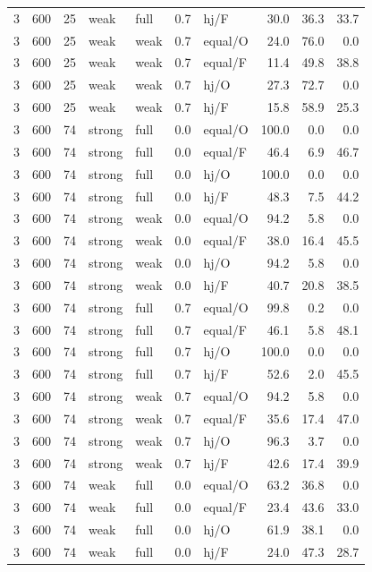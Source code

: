 {\begin{longtable}{@{}rrrllllrrr@{}}
3 & 600 & 25 & weak & full & 0.7 & hj/F & 30.0 & 36.3 & 33.7\\
3 & 600 & 25 & weak & weak & 0.7 & equal/O & 24.0 & 76.0 & 0.0\\
3 & 600 & 25 & weak & weak & 0.7 & equal/F & 11.4 & 49.8 & 38.8\\
3 & 600 & 25 & weak & weak & 0.7 & hj/O & 27.3 & 72.7 & 0.0\\
3 & 600 & 25 & weak & weak & 0.7 & hj/F & 15.8 & 58.9 & 25.3\\
3 & 600 & 74 & strong & full & 0.0 & equal/O & 100.0 & 0.0 & 0.0\\
3 & 600 & 74 & strong & full & 0.0 & equal/F & 46.4 & 6.9 & 46.7\\
3 & 600 & 74 & strong & full & 0.0 & hj/O & 100.0 & 0.0 & 0.0\\
3 & 600 & 74 & strong & full & 0.0 & hj/F & 48.3 & 7.5 & 44.2\\
3 & 600 & 74 & strong & weak & 0.0 & equal/O & 94.2 & 5.8 & 0.0\\
3 & 600 & 74 & strong & weak & 0.0 & equal/F & 38.0 & 16.4 & 45.5\\
3 & 600 & 74 & strong & weak & 0.0 & hj/O & 94.2 & 5.8 & 0.0\\
3 & 600 & 74 & strong & weak & 0.0 & hj/F & 40.7 & 20.8 & 38.5\\
3 & 600 & 74 & strong & full & 0.7 & equal/O & 99.8 & 0.2 & 0.0\\
3 & 600 & 74 & strong & full & 0.7 & equal/F & 46.1 & 5.8 & 48.1\\
3 & 600 & 74 & strong & full & 0.7 & hj/O & 100.0 & 0.0 & 0.0\\
3 & 600 & 74 & strong & full & 0.7 & hj/F & 52.6 & 2.0 & 45.5\\
3 & 600 & 74 & strong & weak & 0.7 & equal/O & 94.2 & 5.8 & 0.0\\
3 & 600 & 74 & strong & weak & 0.7 & equal/F & 35.6 & 17.4 & 47.0\\
3 & 600 & 74 & strong & weak & 0.7 & hj/O & 96.3 & 3.7 & 0.0\\
3 & 600 & 74 & strong & weak & 0.7 & hj/F & 42.6 & 17.4 & 39.9\\
3 & 600 & 74 & weak & full & 0.0 & equal/O & 63.2 & 36.8 & 0.0\\
3 & 600 & 74 & weak & full & 0.0 & equal/F & 23.4 & 43.6 & 33.0\\
3 & 600 & 74 & weak & full & 0.0 & hj/O & 61.9 & 38.1 & 0.0\\
3 & 600 & 74 & weak & full & 0.0 & hj/F & 24.0 & 47.3 & 28.7\\

\end{longtable}}

